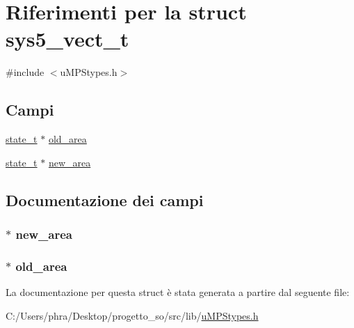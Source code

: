 \hypertarget{structsys5__vect__t}{\section{Riferimenti per la struct sys5\-\_\-vect\-\_\-t}
\label{structsys5__vect__t}
}


{\ttfamily \#include $<$u\-M\-P\-Stypes.\-h$>$}

\subsection*{Campi}
\begin{DoxyCompactItemize}
\item 
\hyperlink{structstate__t}{state\-\_\-t} $\ast$ \hyperlink{structsys5__vect__t_a8ffa7d0bcd8995caca6fd5749002f759}{old\-\_\-area}
\item 
\hyperlink{structstate__t}{state\-\_\-t} $\ast$ \hyperlink{structsys5__vect__t_a59c403793690bd6978a6be755b598f44}{new\-\_\-area}
\end{DoxyCompactItemize}


\subsection{Documentazione dei campi}
\hypertarget{structsys5__vect__t_a59c403793690bd6978a6be755b598f44}{
\subsubsection[{new\-\_\-area}]{$\ast$ new\-\_\-area}}\label{structsys5__vect__t_a59c403793690bd6978a6be755b598f44}
\hypertarget{structsys5__vect__t_a8ffa7d0bcd8995caca6fd5749002f759}{
\subsubsection[{old\-\_\-area}]{$\ast$ old\-\_\-area}}\label{structsys5__vect__t_a8ffa7d0bcd8995caca6fd5749002f759}


La documentazione per questa struct è stata generata a partire dal seguente file\-:\begin{DoxyCompactItemize}
\item 
C\-:/\-Users/phra/\-Desktop/progetto\-\_\-so/src/lib/\hyperlink{u_m_p_stypes_8h}{u\-M\-P\-Stypes.\-h}\end{DoxyCompactItemize}

